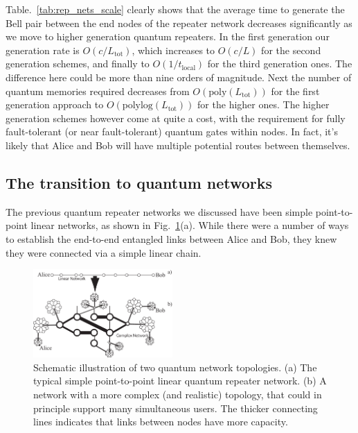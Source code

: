 \documentclass[twocolumn, aps, rmp, amsmath, amssymb, nofootinbib, superscriptaddress, longbibliography, floatfix, table-of-contents, eqsecnum]{revtex4-1}
\newcommand{\comment}[1]{{\color{blue}{\textbf{#1}}}}
\begin{document}
Table.~\ref{tab:rep_nets_scale} clearly shows that the average time to generate the Bell pair between the end nodes of the repeater network decreases significantly as we move to higher generation quantum repeaters. In the first generation our generation rate is $O(c/L_\mathrm{tot})$, which increases to $O(c/L)$ for the second generation schemes, and finally to $O(1/t_\mathrm{local})$ for the third generation ones. The difference here could be more than nine orders of magnitude. Next the number of quantum memories required decreases from $O(\mathrm{poly}(L_\mathrm{tot}))$ for the first generation approach to $O(\mathrm{polylog}(L_\mathrm{tot}))$ for the higher ones. The higher generation schemes however come at quite a cost, with the requirement for fully fault-tolerant (or near fault-tolerant) quantum gates within nodes. In fact, it's likely that Alice and Bob will have multiple potential routes between themselves.

\comment{Up to here}

\subsection{The transition to quantum networks}

The previous quantum repeater networks we discussed have been simple point-to-point linear networks, as shown in Fig.~\ref{fig:repeaters_10}(a). While there were a number of ways to establish the end-to-end entangled links between Alice and Bob, they knew they were connected via a simple linear chain.
 
\begin{figure}[!htb]
\includegraphics[width=0.475\textwidth]{repeaters_10}
\caption{\comment{Redo fig}Schematic illustration of two quantum network topologies. (a) The typical simple point-to-point linear quantum repeater network. (b) A network with a more complex (and realistic) topology, that could in principle support many simultaneous users. The thicker connecting lines indicates that links between nodes have more capacity.}
\label{fig:repeaters_10}
\end{figure} 
\end{document}
